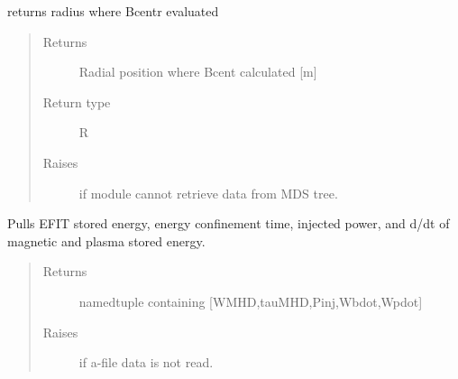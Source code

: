 \documentclass[letterpaper,10pt,english]{sphinxmanual}
\begin{document}
\begin{fulllineitems}
\begin{fulllineitems}
\begin{quote}
\begin{description}
\end{description}\end{quote}

\end{fulllineitems}


\begin{fulllineitems}
\label{\detokenize{eqtools:eqtools.eqdskreader.EqdskReader.getRCentr}}
returns radius where Bcentr evaluated
\begin{quote}\begin{description}
\item[{Returns}] \leavevmode
Radial position where Bcent calculated {[}m{]}

\item[{Return type}] \leavevmode
R

\item[{Raises}] \leavevmode
{} \textendash{} if module cannot retrieve data from MDS tree.

\end{description}\end{quote}

\end{fulllineitems}


\begin{fulllineitems}
\label{\detokenize{eqtools:eqtools.eqdskreader.EqdskReader.getEnergy}}
Pulls EFIT stored energy, energy confinement time, injected power,
and d/dt of magnetic and plasma stored energy.
\begin{quote}\begin{description}
\item[{Returns}] \leavevmode
namedtuple containing {[}WMHD,tauMHD,Pinj,Wbdot,Wpdot{]}

\item[{Raises}] \leavevmode
{} \textendash{} if a-file data is not read.

\end{description}\end{quote}


\end{fulllineitems}
\end{fulllineitems}
\end{document}
